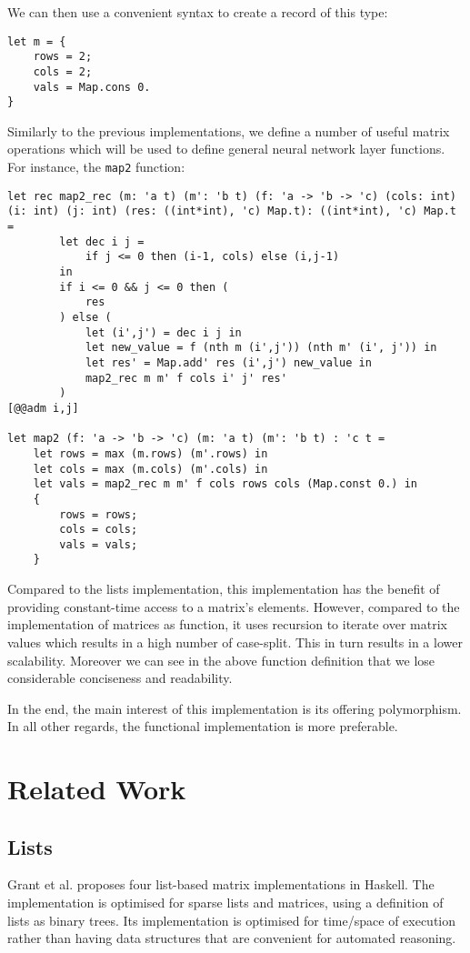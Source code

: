 \documentclass[runningheads]{llncs}
\begin{document}
We can then use a convenient syntax to create a record of this type:

\begin{lstlisting}[language=caml]
let m = {
	rows = 2;
	cols = 2;
	vals = Map.cons 0.
}
\end{lstlisting}

Similarly to the previous implementations, we define a number of useful matrix operations which will be used to define general neural network layer functions. For instance, the \lstinline{map2} function:

\begin{lstlisting}[language=caml]
let rec map2_rec (m: 'a t) (m': 'b t) (f: 'a -> 'b -> 'c) (cols: int) (i: int) (j: int) (res: ((int*int), 'c) Map.t): ((int*int), 'c) Map.t =
		let dec i j = 
			if j <= 0 then (i-1, cols) else (i,j-1)     
		in
		if i <= 0 && j <= 0 then (
			res
		) else (
			let (i',j') = dec i j in
			let new_value = f (nth m (i',j')) (nth m' (i', j')) in
			let res' = Map.add' res (i',j') new_value in
			map2_rec m m' f cols i' j' res'
		)
[@@adm i,j]

let map2 (f: 'a -> 'b -> 'c) (m: 'a t) (m': 'b t) : 'c t = 
	let rows = max (m.rows) (m'.rows) in
	let cols = max (m.cols) (m'.cols) in
	let vals = map2_rec m m' f cols rows cols (Map.const 0.) in
	{
		rows = rows;
		cols = cols;
		vals = vals;
	}
\end{lstlisting} 

Compared to the lists implementation, this implementation has the benefit of providing constant-time access to a matrix's elements. However, compared to the implementation of matrices as function, it uses recursion to iterate over matrix values which results in a high number of case-split. This in turn results in a lower scalability. Moreover we can see in the above function definition that we lose considerable conciseness and readability.

In the end, the main interest of this implementation is its offering polymorphism. In all other regards, the functional implementation is more preferable.

\iffalse
\section{Related Work}
\subsection{Lists}
Grant et al. \cite{grant_sparse_1996} proposes four list-based matrix implementations in Haskell. The implementation is optimised for sparse lists and matrices, using a definition of lists as binary trees. Its implementation is optimised for time/space of execution rather than having data structures that are convenient for automated reasoning.
\end{document}
